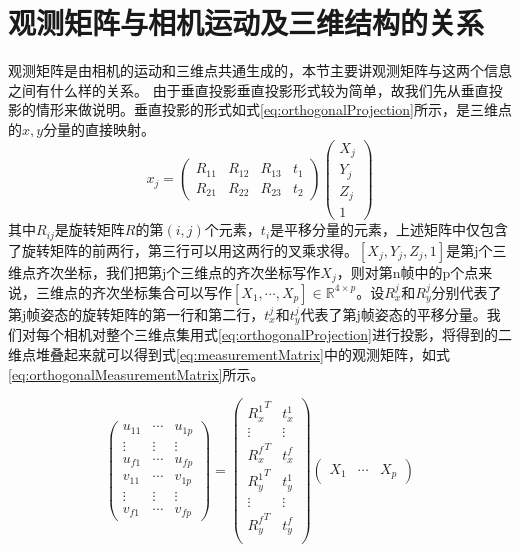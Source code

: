 \section{观测矩阵与相机运动及三维结构的关系}\label{subsec:measurementMatrix}
观测矩阵是由相机的运动和三维点共通生成的，本节主要讲观测矩阵与这两个信息之间有什么样的关系。
由于垂直投影垂直投影形式较为简单，故我们先从垂直投影的情形来做说明\cite{Tomasi1992Shape}。垂直投影的形式如式\eqref{eq:orthogonalProjection}所示，是三维点的$x,y$分量的直接映射。
\begin{equation}\label{eq:orthogonalProjection}
x_j=
\begin{pmatrix}
R_{11} & R_{12} & R_{13} & t_1\\
R_{21} & R_{22} & R_{23} & t_2
\end{pmatrix}
\begin{pmatrix}
X_j\\Y_j\\Z_j\\1
\end{pmatrix}
\end{equation}
其中$R_{ij}$是旋转矩阵$R$的第$(i,j)$个元素，$t_i$是平移分量的元素，上述矩阵中仅包含了旋转矩阵的前两行，第三行可以用这两行的叉乘求得。$[X_j,Y_j,Z_j,1]$是第j个三维点齐次坐标，我们把第j个三维点的齐次坐标写作$X_j$，则对第n帧中的p个点来说，三维点的齐次坐标集合可以写作$[X_1,\cdots,X_p]\in \mathbb{R}^{4\times p}$。设$R_x^j$和$R_y^j$分别代表了第j帧姿态的旋转矩阵的第一行和第二行，$t_x^j$和$t_y^j$代表了第j帧姿态的平移分量。我们对每个相机对整个三维点集用式\eqref{eq:orthogonalProjection}进行投影，将得到的二维点堆叠起来就可以得到式\eqref{eq:measurementMatrix}中的观测矩阵，如式\eqref{eq:orthogonalMeasurementMatrix}所示。

\begin{equation}\label{eq:orthogonalMeasurementMatrix}
\begin{pmatrix}
u_{11}& \cdots & u_{1p}\\
\vdots& \vdots &\vdots\\
u_{f1}& \cdots & u_{fp}\\
v_{11}& \cdots & v_{1p}\\
\vdots& \vdots &\vdots\\
v_{f1}& \cdots & v_{fp}
\end{pmatrix}
=
\begin{pmatrix}
{R_x^1}^T & t_x^1\\
\vdots & \vdots\\
{R_x^f}^T & t_x^f\\
{R_y^1}^T & t_y^1\\
\vdots & \vdots\\
{R_y^f}^T & t_y^f\\
\end{pmatrix}
\begin{pmatrix}
X_1&\cdots &X_p
\end{pmatrix}
\end{equation}


